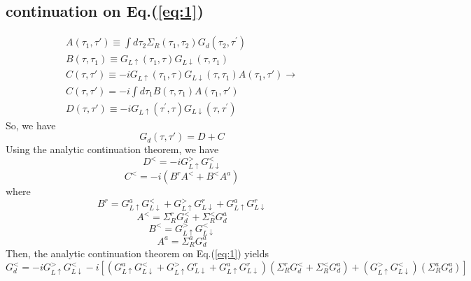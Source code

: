 \documentclass[aps,prb,onecolumn,amssymb,amsmath,superscriptaddress]{revtex4-1}
\begin{document}
\subsection{continuation on Eq.(\ref{eq:1})}
\begin{eqnarray}
A(\tau_{1}, \tau') \equiv\int d\tau_{2}\Sigma_{R }\left(\tau_{1}, \tau_{2}\right) G_{d}\left(\tau_{2}, \tau^{\prime}\right)\\
B(\tau, \tau_{1}) \equiv G_{L \uparrow}\left(\tau_{1}, \tau\right) G_{L \downarrow}\left(\tau, \tau_{1}\right)\\
C(\tau, \tau')\equiv -i G_{L \uparrow}\left(\tau_{1}, \tau\right) G_{L \downarrow}\left(\tau, \tau_{1}\right) A(\tau_{1}, \tau') \rightarrow \\
C(\tau, \tau') = -i\int d\tau_{1}B(\tau, \tau_{1})A(\tau_{1}, \tau')\\
D(\tau, \tau') \equiv -i G_{L \uparrow}\left(\tau^{\prime}, \tau\right) G_{L \downarrow}\left(\tau, \tau^{\prime}\right)
\end{eqnarray}
So, we have
\begin{equation}
G_{d}(\tau, \tau') = D + C
\end{equation}
Using the analytic continuation theorem, we have
\begin{equation}
D^{<} = -i G_{L \uparrow}^{>} G_{L \downarrow}^{<}
\end{equation}
\begin{equation}
C^{<}=-i(B^{r} A^{<}+B^{<} A^{a})
\end{equation}
where
\begin{equation}
B^{r} = G_{L \uparrow}^{a} G_{L \downarrow}^{<}+G_{L \uparrow}^{>} G_{L \downarrow}^{r}+G_{L \uparrow}^{a} G_{L \downarrow}^{r}
\end{equation}
\begin{equation}
A^{<}=\Sigma_{R}^{r} G_{d}^{<}+\Sigma_{R}^{<} G_{d}^{a}
\end{equation}
\begin{equation}
B^{<}=G_{L\uparrow}^{>} G_{L\downarrow}^{<}
\end{equation}
\begin{equation}
A^{a}=\Sigma_{R}^{a} G_{d}^{a}
\end{equation}
Then, the analytic continuation theorem on Eq.(\ref{eq:1}) yields
\begin{equation}
G_{d}^{<}=-i G_{L \uparrow}^{>} G_{L \downarrow}^{<} -i\left[(G_{L \uparrow}^{a} G_{L \downarrow}^{<}+G_{L \uparrow}^{>} G_{L \downarrow}^{r}+G_{L \uparrow}^{a} G_{L \downarrow}^{r})(\Sigma_{R}^{r} G_{d}^{<}+\Sigma_{R}^{<} G_{d}^{a}) + (G_{L\uparrow}^{>} G_{L\downarrow}^{<})(\Sigma_{R}^{a} G_{d}^{a})\right]
\label{eq:Gd<}
\end{equation}
\end{document}
